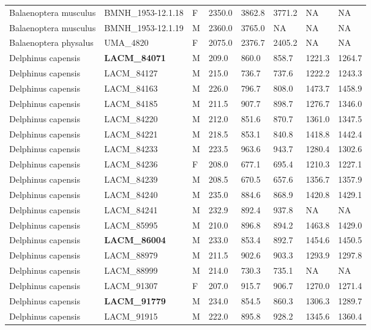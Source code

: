 \begin{longtable}{|p{1.95in}p{1.1in}p{.15in}p{.4in}p{.4in}p{.4in}p{.4in}p{.4in}|}
  Balaenoptera musculus & BMNH\_1953-12.1.18 & F & 2350.0 & 3862.8 & 3771.2 & NA & NA  \\ 
  Balaenoptera musculus & BMNH\_1953-12.1.19 & M & 2360.0 & 3765.0 & NA & NA & NA  \\ 
  Balaenoptera physalus & UMA\_4820 & F & 2075.0 & 2376.7 & 2405.2 & NA & NA  \\ 
  Delphinus capensis & \textbf{ LACM\_84071 } & M & 209.0 & 860.0 & 858.7 & 1221.3 & 1264.7 \\ 
  Delphinus capensis & LACM\_84127 & M & 215.0 & 736.7 & 737.6 & 1222.2 & 1243.3 \\ 
  Delphinus capensis & LACM\_84163 & M & 226.0 & 796.7 & 808.0 & 1473.7 & 1458.9 \\ 
  Delphinus capensis & LACM\_84185 & M & 211.5 & 907.7 & 898.7 & 1276.7 & 1346.0 \\ 
  Delphinus capensis & LACM\_84220 & M & 212.0 & 851.6 & 870.7 & 1361.0 & 1347.5 \\ 
  Delphinus capensis & LACM\_84221 & M & 218.5 & 853.1 & 840.8 & 1418.8 & 1442.4 \\ 
  Delphinus capensis & LACM\_84233 & M & 223.5 & 963.6 & 943.7 & 1280.4 & 1302.6 \\ 
  Delphinus capensis & LACM\_84236 & F & 208.0 & 677.1 & 695.4 & 1210.3 & 1227.1 \\ 
  Delphinus capensis & LACM\_84239 & M & 208.5 & 670.5 & 657.6 & 1356.7 & 1357.9 \\ 
  Delphinus capensis & LACM\_84240 & M & 235.0 & 884.6 & 868.9 & 1420.8 & 1429.1 \\ 
  Delphinus capensis & LACM\_84241 & M & 232.9 & 892.4 & 937.8 & NA & NA  \\ 
  Delphinus capensis & LACM\_85995 & M & 210.0 & 896.8 & 894.2 & 1463.8 & 1429.0 \\ 
  Delphinus capensis & \textbf{ LACM\_86004 } & M & 233.0 & 853.4 & 892.7 & 1454.6 & 1450.5 \\ 
  Delphinus capensis & LACM\_88979 & M & 211.5 & 902.6 & 903.3 & 1293.9 & 1297.8 \\ 
  Delphinus capensis & LACM\_88999 & M & 214.0 & 730.3 & 735.1 & NA & NA  \\ 
  Delphinus capensis & LACM\_91307 & F & 207.0 & 915.7 & 906.7 & 1270.0 & 1271.4 \\ 
  Delphinus capensis & \textbf{ LACM\_91779 } & M & 234.0 & 854.5 & 860.3 & 1306.3 & 1289.7 \\ 
  Delphinus capensis & LACM\_91915 & M & 222.0 & 895.8 & 928.2 & 1345.6 & 1360.4 \\ 

\end{longtable}
